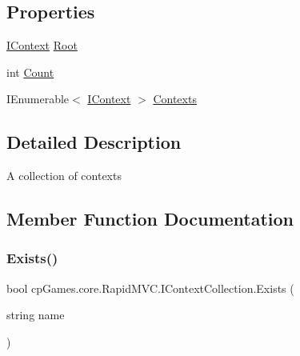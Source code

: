 \subsection*{Properties}
\begin{DoxyCompactItemize}
\item 
\mbox{\hyperlink{interfacecp_games_1_1core_1_1_rapid_m_v_c_1_1_i_context}{I\+Context}} \mbox{\hyperlink{interfacecp_games_1_1core_1_1_rapid_m_v_c_1_1_i_context_collection_a995731ffa92565a90f8b176596a5658a}{Root}}
\item 
int \mbox{\hyperlink{interfacecp_games_1_1core_1_1_rapid_m_v_c_1_1_i_context_collection_a3567007696dbd07fa6bd839d4c82fb6b}{Count}}
\item 
I\+Enumerable$<$ \mbox{\hyperlink{interfacecp_games_1_1core_1_1_rapid_m_v_c_1_1_i_context}{I\+Context}} $>$ \mbox{\hyperlink{interfacecp_games_1_1core_1_1_rapid_m_v_c_1_1_i_context_collection_abac0a1b73a4c00c78860d5b246ba50be}{Contexts}}
\end{DoxyCompactItemize}


\subsection{Detailed Description}
A collection of contexts 



\subsection{Member Function Documentation}
\mbox{\label{interfacecp_games_1_1core_1_1_rapid_m_v_c_1_1_i_context_collection_a341363d37ac179e4b157d97f6e69404f}} 
\subsubsection{\texorpdfstring{Exists()}{Exists()}}
{\footnotesize\ttfamily bool cp\+Games.\+core.\+Rapid\+M\+V\+C.\+I\+Context\+Collection.\+Exists (\begin{DoxyParamCaption}\item[{string}]{name }\end{DoxyParamCaption})}



